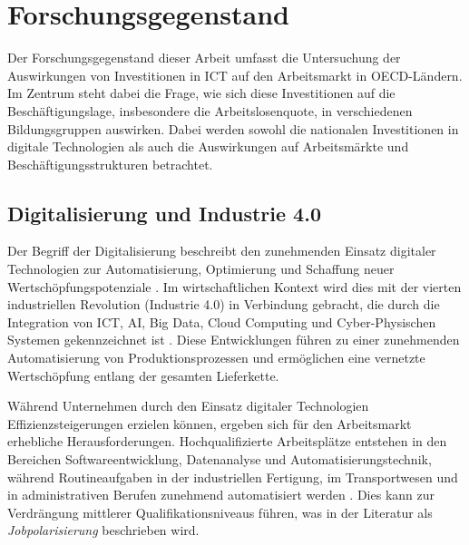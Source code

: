 
\section{Forschungsgegenstand}

Der Forschungsgegenstand dieser Arbeit umfasst die Untersuchung der Auswirkungen von 
Investitionen in \ac{ICT} auf den Arbeitsmarkt in \ac{OECD}-Ländern. Im Zentrum steht 
dabei die Frage, wie sich diese Investitionen auf die Beschäftigungslage, insbesondere 
die Arbeitslosenquote, in verschiedenen Bildungsgruppen auswirken. Dabei werden sowohl 
die nationalen Investitionen in digitale Technologien als auch die Auswirkungen auf 
Arbeitsmärkte und Beschäftigungsstrukturen betrachtet.


\subsection{Digitalisierung und Industrie 4.0}

Der Begriff der Digitalisierung beschreibt den zunehmenden Einsatz digitaler Technologien
zur Automatisierung, Optimierung und Schaffung neuer Wertschöpfungspotenziale
\parencite[vgl.][S. 6]{brennen2016theinternational}. Im wirtschaftlichen Kontext wird dies
mit der vierten industriellen Revolution (Industrie 4.0) in Verbindung gebracht, die durch
die Integration von \ac{ICT}, \ac{AI}, Big Data, Cloud Computing und Cyber-Physischen Systemen
gekennzeichnet ist \parencite[vgl.][S. 22]{kagermann2013recommendations}. Diese Entwicklungen
führen zu einer zunehmenden Automatisierung von Produktionsprozessen und ermöglichen eine
vernetzte Wertschöpfung entlang der gesamten Lieferkette.

Während Unternehmen durch den Einsatz digitaler Technologien Effizienzsteigerungen erzielen
können, ergeben sich für den Arbeitsmarkt erhebliche Herausforderungen. Hochqualifizierte
Arbeitsplätze entstehen in den Bereichen Softwareentwicklung, Datenanalyse und
Automatisierungstechnik, während Routineaufgaben in der industriellen Fertigung, im
Transportwesen und in administrativen Berufen zunehmend automatisiert werden
\parencite[vgl.][S. 40]{frey2013thefuture}. Dies kann zur Verdrängung mittlerer
Qualifikationsniveaus führen, was in der Literatur als \textit{Jobpolarisierung} beschrieben wird.

